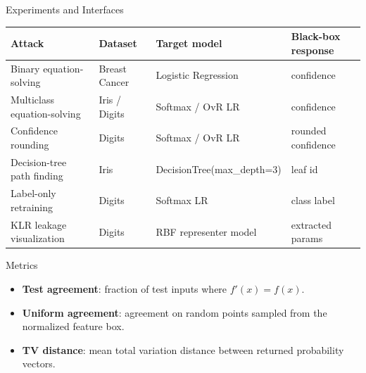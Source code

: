 \documentclass[aspectratio=169,11pt]{ctexbeamer}
\begin{document}
\begin{frame}{Experiments and Interfaces}
  \small
  \begin{tabular}{llll}
    \toprule
    Attack & Dataset & Target model & Black-box response \\
    \midrule
    Binary equation-solving & Breast Cancer & Logistic Regression & confidence \\
    Multiclass equation-solving & Iris / Digits & Softmax / OvR LR & confidence \\
    Confidence rounding & Digits & Softmax / OvR LR & rounded confidence \\
    Decision-tree path finding & Iris & DecisionTree(max\_depth=3) & leaf id \\
    Label-only retraining & Digits & Softmax LR & class label \\
    KLR leakage visualization & Digits & RBF representer model & extracted params \\
    \bottomrule
  \end{tabular}
  \vspace{0.9em}

  \begin{block}{Metrics}
    \begin{itemize}
      \item \textbf{Test agreement}: fraction of test inputs where $f'(x)=f(x)$.
      \item \textbf{Uniform agreement}: agreement on random points sampled from the normalized feature box.
      \item \textbf{TV distance}: mean total variation distance between returned probability vectors.
    \end{itemize}
  \end{block}
\end{frame}
\end{document}
